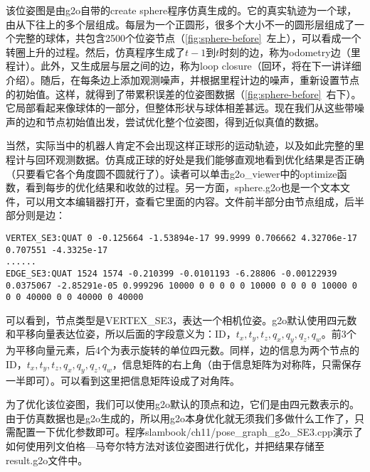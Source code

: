 该位姿图是由g2o自带的create sphere程序仿真生成的。它的真实轨迹为一个球，由从下往上的多个层组成。每层为一个正圆形，很多个大小不一的圆形层组成了一个完整的球体，共包含2500个位姿节点（\autoref{fig:sphere-before}~左上），可以看成一个转圈上升的过程。然后，仿真程序生成了$t-1$到$t$时刻的边，称为odometry边（里程计）。此外，又生成层与层之间的边，称为loop closure（回环，将在下一讲详细介绍）。随后，在每条边上添加观测噪声，并根据里程计边的噪声，重新设置节点的初始值。这样，就得到了带累积误差的位姿图数据（\autoref{fig:sphere-before}~右下）。它局部看起来像球体的一部分，但整体形状与球体相差甚远。现在我们从这些带噪声的边和节点初始值出发，尝试优化整个位姿图，得到近似真值的数据。

当然，实际当中的机器人肯定不会出现这样正球形的运动轨迹，以及如此完整的里程计与回环观测数据。仿真成正球的好处是我们能够直观地看到优化结果是否正确（只要看它各个角度圆不圆就行了）。读者可以单击g2o\_viewer中的optimize函数，看到每步的优化结果和收敛的过程。另一方面，sphere.g2o也是一个文本文件，可以用文本编辑器打开，查看它里面的内容。文件前半部分由节点组成，后半部分则是边：

\begin{lstlisting}
VERTEX_SE3:QUAT 0 -0.125664 -1.53894e-17 99.9999 0.706662 4.32706e-17 0.707551 -4.3325e-17 
......
EDGE_SE3:QUAT 1524 1574 -0.210399 -0.0101193 -6.28806 -0.00122939 0.0375067 -2.85291e-05 0.999296 10000 0 0 0 0 0 10000 0 0 0 0 10000 0 0 0 40000 0 0 40000 0 40000 
\end{lstlisting}

可以看到，节点类型是VERTEX\_SE3，表达一个相机位姿。g2o默认使用四元数和平移向量表达位姿，所以后面的字段意义为：ID，$t_x, t_y, t_z, q_x, q_y, q_z, q_w$。前3个为平移向量元素，后4个为表示旋转的单位四元数。同样，边的信息为两个节点的ID，$t_x, t_y, t_z, q_x, q_y, q_z, q_w$，信息矩阵的右上角（由于信息矩阵为对称阵，只需保存一半即可）。可以看到这里把信息矩阵设成了对角阵。

为了优化该位姿图，我们可以使用g2o默认的顶点和边，它们是由四元数表示的。由于仿真数据也是g2o生成的，所以用g2o本身优化就无须我们多做什么工作了，只需配置一下优化参数即可。程序slambook/ch11/pose\_graph\_g2o\_SE3.cpp演示了如何使用列文伯格—马夸尔特方法对该位姿图进行优化，并把结果存储至result.g2o文件中。

